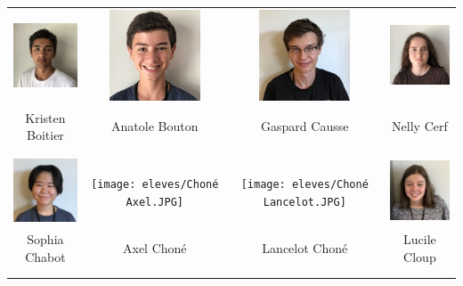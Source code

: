 \begin{center}
\begin{tabular}{cccc}
\includegraphics[angle=270,origin=c, width=27mm]{eleves/Boitier Kristen.JPG} &
\includegraphics[angle=270,origin=c, width=27mm]{eleves/Bouton Anatole.JPG} &
\includegraphics[angle=270,origin=c, width=27mm]{eleves/Causse Gaspard.JPG} &
\includegraphics[angle=270,origin=c, width=27mm]{eleves/Cerf Nelly.JPG} \\
Kristen Boitier & Anatole Bouton & Gaspard Causse & Nelly Cerf \\ \\ \\ 

\includegraphics[angle=270,origin=c, width=27mm]{eleves/Chabot Sophia.JPG} &
\texttt{[image: eleves/Choné Axel.JPG]} &
\texttt{[image: eleves/Choné Lancelot.JPG]} &
\includegraphics[angle=270,origin=c, width=27mm]{eleves/Cloup Lucile.JPG} \\
Sophia Chabot & Axel Choné & Lancelot Choné & Lucile Cloup \\ \\ \\ 


\end{tabular}
\end{center}
